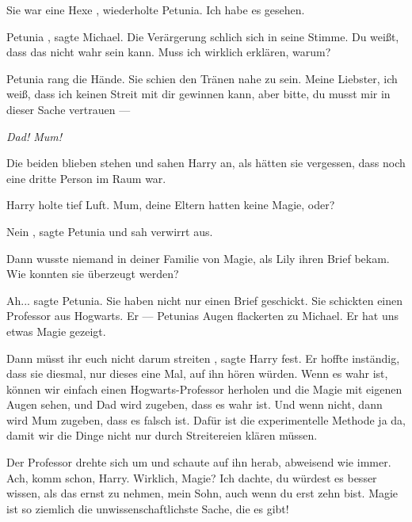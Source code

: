 \glqq Sie war eine Hexe\grqq{} , wiederholte Petunia. \glqq Ich habe es gesehen.\grqq{}

\glqq Petunia\grqq{} , sagte Michael. Die Verärgerung schlich sich in seine Stimme. \glqq Du
weißt, dass das nicht wahr sein kann. Muss ich wirklich erklären, warum?\grqq{}

Petunia rang die Hände. Sie schien den Tränen nahe zu sein. \glqq Meine Liebster, ich
weiß, dass ich keinen Streit mit dir gewinnen kann, aber bitte, du musst mir in
dieser Sache vertrauen ---\grqq{}

\glqq \emph{Dad! Mum!}\grqq{}

Die beiden blieben stehen und sahen Harry an, als hätten sie
vergessen, dass noch eine dritte Person im Raum war.

Harry holte tief Luft. \glqq Mum, deine Eltern hatten keine Magie, oder?\grqq{}

\glqq Nein\grqq{} , sagte Petunia und sah verwirrt aus.

\glqq Dann wusste niemand in deiner Familie von Magie, als Lily ihren Brief bekam.
Wie konnten sie überzeugt werden?\grqq{}

\glqq Ah...\grqq{} sagte Petunia. \glqq Sie haben nicht nur einen Brief geschickt. Sie schickten
einen Professor aus Hogwarts. Er ---\grqq{} Petunias Augen flackerten zu
Michael. \glqq Er hat uns etwas Magie gezeigt.\grqq{}

\glqq Dann müsst ihr euch nicht darum streiten\grqq{} , sagte Harry fest. Er hoffte
inständig, dass sie diesmal, nur dieses eine Mal, auf ihn hören würden. \glqq Wenn es
wahr ist, können wir einfach einen Hogwarts-Professor herholen und die Magie mit
eigenen Augen sehen, und Dad wird zugeben, dass es wahr ist. Und wenn nicht,
dann wird Mum zugeben, dass es falsch ist. Dafür ist die experimentelle Methode
ja da, damit wir die Dinge nicht nur durch Streitereien klären müssen.\grqq{}

Der Professor drehte sich um und schaute auf ihn herab, abweisend wie immer.
\glqq Ach, komm schon, Harry. Wirklich, Magie? Ich dachte, du würdest es besser
wissen, als das ernst zu nehmen, mein Sohn, auch wenn du erst zehn bist. Magie
ist so ziemlich die unwissenschaftlichste Sache, die es gibt!\grqq{}

